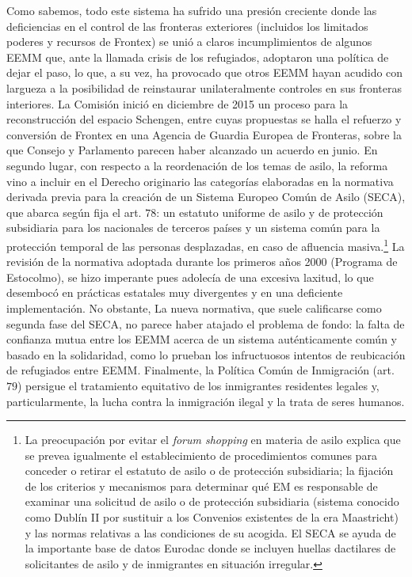 \documentclass[10pt,a4paper]{article}
\begin{document}
{Como sabemos, todo este sistema ha sufrido una presión creciente donde las deficiencias en el control de las fronteras exteriores (incluidos los limitados poderes y recursos de Frontex) se unió a claros incumplimientos de algunos EEMM que, ante la llamada crisis de los refugiados, adoptaron una política de dejar el paso, lo que, a su vez, ha provocado que otros EEMM hayan acudido con largueza a la posibilidad de reinstaurar unilateralmente controles en sus fronteras interiores. La Comisión inició en diciembre de 2015 un proceso para la reconstrucción del espacio Schengen, entre cuyas propuestas se halla el refuerzo y conversión de Frontex en una Agencia de Guardia Europea de Fronteras, sobre la que Consejo y Parlamento parecen haber alcanzado un acuerdo en junio.
} En segundo lugar, con respecto a la reordenación de los temas de asilo, la reforma vino a incluir en el Derecho originario las categorías elaboradas en la normativa derivada previa para la creación de un Sistema Europeo Común de Asilo (SECA), que abarca según fija el art. $78$: un estatuto uniforme de asilo y de protección subsidiaria para los nacionales de terceros países y un sistema común para la protección temporal de las personas desplazadas, en caso de afluencia masiva.\footnote{%
    La preocupación por evitar el \textit{forum shopping} en materia de asilo explica que se prevea igualmente el establecimiento de procedimientos comunes para conceder o retirar el estatuto de asilo o de protección subsidiaria; la fijación de los criterios y mecanismos para determinar qué EM es responsable de examinar una solicitud de asilo o de protección subsidiaria (sistema conocido como Dublín II por sustituir a los Convenios existentes de la era Maastricht) y las normas relativas a las condiciones de su acogida. El SECA se ayuda de la importante base de datos Eurodac donde se incluyen huellas dactilares de solicitantes de asilo y de inmigrantes en situación irregular.
} La revisión de la normativa adoptada durante los primeros años 2000 (Programa de Estocolmo), se hizo imperante pues adolecía de una excesiva laxitud, lo que desembocó en prácticas estatales muy divergentes y en una deficiente implementación. No obstante, La nueva normativa, que suele calificarse como segunda fase del SECA, no parece haber atajado el problema de fondo: la falta de confianza mutua entre los EEMM acerca de un sistema auténticamente común y basado en la solidaridad, como lo prueban los infructuosos intentos de reubicación de refugiados entre EEMM. Finalmente, la Política Común de Inmigración (art. $79$) persigue el tratamiento equitativo de los inmigrantes residentes legales y, particularmente, la lucha contra la inmigración ilegal y la trata de seres humanos.
\end{document}
